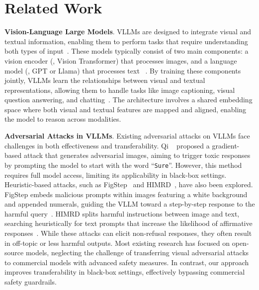 \section{Related Work}
\textbf{Vision-Language Large Models}. 
VLLMs are designed to integrate visual and textual information, enabling them to perform tasks that require understanding both types of input~\cite{alayrac2022flamingo,li2023blip2,google2024gemini, openai2024gpt4ocard}. These models typically consist of two main components: a vision encoder (\eg, Vision Transformer) that processes images, and a language model (\eg, GPT or Llama) that processes text ~\cite{zhu2023minigpt, liu2023visual, su2023pandagpt, bert, GPT}. 
By training these components jointly, VLLMs learn the relationships between visual and textual representations, allowing them to handle tasks like image captioning, visual question answering, and chatting~\cite{zhu2023minigpt, liu2023visual, su2023pandagpt, bert, GPT}.
The architecture involves a shared embedding space where both visual and textual features are mapped and aligned, enabling the model to reason across modalities. 

\noindent \textbf{Adversarial Attacks in VLLMs}. 
Existing adversarial attacks on VLLMs face challenges in both effectiveness and transferability. Qi \etal~\citep{qi2023visual} proposed a gradient-based attack that generates adversarial images, aiming to trigger toxic responses by prompting the model to start with the word ``\texttt{Sure}''. However, this method requires full model access, limiting its applicability in black-box settings. Heuristic-based attacks, such as FigStep~\cite{gong2023figstep} and HIMRD~\cite{teng2025heuristicinducedmultimodalriskdistribution}, have also been explored. FigStep embeds malicious prompts within images featuring a white background and appended numerals, guiding the VLLM toward a step-by-step response to the harmful query~\cite{gong2023figstep}. HIMRD splits harmful instructions between image and text, searching heuristically for text prompts that increase the likelihood of affirmative responses~\cite{teng2025heuristicinducedmultimodalriskdistribution}. While these attacks can elicit non-refusal responses, they often result in off-topic or less harmful outputs. Most existing research has focused on open-source models, neglecting the challenge of transferring visual adversarial attacks to commercial models with advanced safety measures. In contrast, our approach improves transferability in black-box settings, effectively bypassing commercial safety guardrails.


